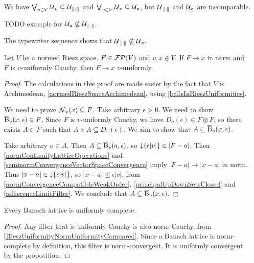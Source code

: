 \begin{example}
We have $\bigvee_{v\in V}\operatorname{\mathcal{U}}_{v} \subseteq \operatorname{\mathcal{U}}_{\lVert\cdot\rVert}$ and $\bigvee_{v\in V}\operatorname{\mathcal{U}}_{v} \subseteq \operatorname{\mathcal{U}}_{\mathfrak{o}}$, but $\operatorname{\mathcal{U}}_{\lVert\cdot\rVert}$ and $\operatorname{\mathcal{U}}_{\mathfrak{o}}$ are incomparable.

TODO example for $\operatorname{\mathcal{U}}_{\mathfrak{o}} \nsubseteq \operatorname{\mathcal{U}}_{\lVert\cdot\rVert}$.

The typewriter sequence shows that $\operatorname{\mathcal{U}}_{\lVert\cdot\rVert} \nsubseteq \operatorname{\mathcal{U}}_{\mathfrak{o}}$.
\end{example}

\begin{proposition}
Let $V$ be a normed Riesz space, $F\in\operatorname{\mathcal{FP}}(V)$ and $v,x\in V$. If $F\to x$ in norm and $F$ is $v$-uniformly Cauchy, then $F\to x$ $v$-uniformly.
\end{proposition}
\begin{proof}
The calculations in this proof are made easier by the fact that $V$ is Archimedean, \ref{normedRieszSpaceArchimedean}, using \ref{ballsInRieszUniformities}.

We need to prove $\operatorname{\mathcal{N}}_v(x) \subseteq F$. Take arbitrary $\epsilon > 0$. We need to show $\operatorname{\overline{B}}_v(x,\epsilon) \in F$. Since $F$ is $v$-uniformly Cauchy, we have $D_v(\epsilon) \in F\otimes F$, so there exists $A\in F$ such that $A\times A \subseteq D_v(\epsilon)$. We aim to show that $A \subseteq \operatorname{\overline{B}}_v(x,\epsilon)$.

Take arbitrary $a\in A$. Then $A \subseteq \operatorname{\overline{B}}_v(a,\epsilon)$, so $\operatorname{\downarrow}\{\epsilon|v|\} \in |F-a|$. Then \ref{normContinuityLatticeOperations} and \ref{seminormConvergenceVectorSpaceConvergence} imply $|F-a| \to |x-a|$ in norm. Thus $|x-a| \in \operatorname{\downarrow}\{\epsilon|v|\}$, so $|x-a| \leq \epsilon |v|$, from \ref{normConvergenceCompatibleWeakOrder}, \ref{principalUpDownSetsClosed} and \ref{adherenceLimitFilter}. We conclude that $A \subseteq \operatorname{\overline{B}}_v(x,\epsilon)$.
\end{proof}
\begin{corollary}
Every Banach lattice is uniformly complete.
\end{corollary}
\begin{proof}
Any filter that is uniformly Cauchy is also norm-Cauchy, from \ref{RieszUniformityNormUniformityCompared}. Since a Banach lattice is norm-complete by definition, this filter is norm-convergent. It is uniformly convergent by the proposition.
\end{proof}

